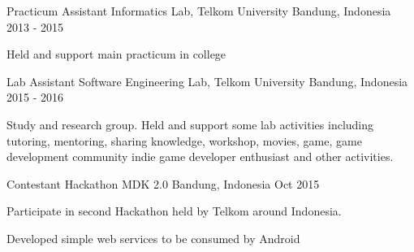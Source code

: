 \begin{cventries}

\cventry
    {Practicum Assistant}
    {Informatics Lab, Telkom University}
    {Bandung, Indonesia}
    {2013 - 2015}
    {
        \begin{cvitems}
            \item {Held and support main practicum in college}
        \end{cvitems}
    }

\cventry
    {Lab Assistant}
    {Software Engineering Lab, Telkom University}
    {Bandung, Indonesia}
    {2015 - 2016}
    {
        \begin{cvitems}
            \item {Study and research group. Held and support some lab activities including tutoring, mentoring, sharing knowledge, workshop, movies, game, game development community indie game developer enthusiast and other activities.}
        \end{cvitems}
    }

\cventry
    {Contestant}
    {Hackathon MDK 2.0}
    {Bandung, Indonesia}
    {Oct 2015}
    {
        \begin{cvitems}
            \item {Participate in second Hackathon held by Telkom around Indonesia.}
            \item {Developed simple web services to be consumed by Android}
        \end{cvitems}
    }

\end{cventries}
